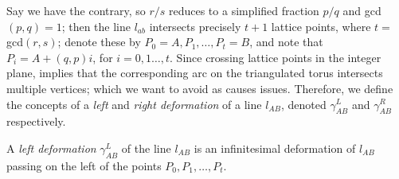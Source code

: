 Say we have the contrary, so $r/s$ reduces to a simplified fraction $p/q$ and gcd$(p,q)=1$; then the line $l_{ab}$ intersects precisely $t+1$ lattice points, where $t =$gcd$(r,s)$; denote these by $P_0 = A,P_1,\dots, P_t = B$, and note that $P_i = A + (q,p)i$, for $i = 0,1\dots,t$. Since crossing lattice points in the integer plane, implies that the corresponding arc on the triangulated torus intersects multiple vertices; which we want to avoid as causes issues. Therefore, we define the concepts of a \emph{left} and \emph{right deformation} of a line $l_{AB}$, denoted $\gamma_{AB}^L$ and $\gamma_{AB}^R$ respectively.
\begin{definition}
    A \emph{left deformation} $\gamma_{AB}^L$ of the line $l_{AB}$ is an infinitesimal deformation of $l_{AB}$ passing on the left of the points $P_0,P_1,\dots,P_t$.
\end{definition}
